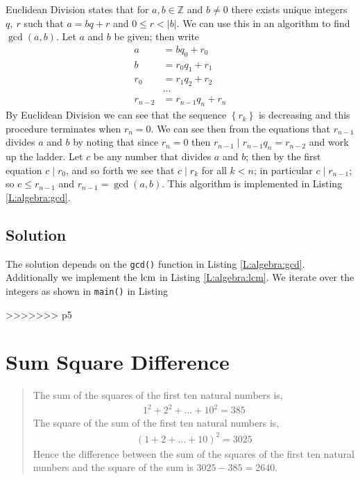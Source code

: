 \documentclass[oneside,12pt]{book}   	%
\newcounter{ex}
\newcounter{pr}
\theoremstyle{definition}
\newcommand{\lcm}[1]{\mathrm{lcm }#1}
\newcommand{\set}[1]{\left\{#1\right\}}
\newcommand{\order}[1]{\left| #1 \right|}
\begin{document}
\begin{spacing}{1.618}
			Euclidean Division states that for $a,b\in\mathbb{Z}$ and $b\neq 0$ there exists unique integers $q,~r$ such that $a=bq+r$ and $0\leq r< \order{b}$. We can use this in an algorithm to find $\gcd{(a,b)}$. Let $a$ and $b$ be given; then write 
			\begin{alignat*}{4}
				a&=bq_0+r_0 \\
				b&=r_0q_1+r_1 \\
				r_0&=r_1q_2+r_2 \\
				&\dots \\
				r_{n-2}&=r_{n-1}q_n+r_n
			\end{alignat*}
			By Euclidean Division we can see that the sequence $\set{r_k}$ is decreasing and this procedure terminates when $r_n=0$. We can see then from the equations that $r_{n-1}$ divides $a$ and $b$ by noting that since $r_n=0$ then $r_{n-1}\mid r_{n-1}q_n=r_{n-2}$ and work up the ladder.  Let $c$ be any number that divides $a$ and $b$; then by the first equation $c\mid r_0$, and so forth we see that $c\mid r_k$ for all $k<n$; in particular $c\mid r_{n-1}$; so $c\leq r_{n-1}$ and $r_{n-1}=\gcd{(a,b)}$. This algorithm is implemented in Listing \ref{L:algebra:gcd}. 
			
			
			
		\section{Solution}
		
			
			The solution depends on the \texttt{gcd()} function in Listing \ref{L:algebra:gcd}. Additionally we implement the $\lcm$ in Listing \ref{L:algebra:lcm}. We iterate over the integers as shown in \texttt{main()} in Listing 
			
			
>>>>>>> p5
	
	\chapter{Sum Square Difference}
	
		\begin{quote}
			The sum of the squares of the first ten natural numbers is,
			\begin{alignat*}{4}
				1^2+2^2+\dots +10^2 = 385
			\end{alignat*}
			The square of the sum of the first ten natural numbers is,
			\begin{alignat*}{4}
				\left(1+2+\dots +10\right)^2=3025
			\end{alignat*}
			Hence the difference between the sum of the squares of the first ten natural numbers and the square of the sum is $3025-385=2640$.


\end{quote}
\end{spacing}
\end{document}
